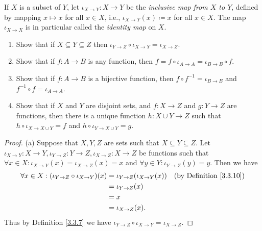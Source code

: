 \begin{exercise}\label{ex 3.3.8}
    If \(X\) is a subset of \(Y\), let \(\iota_{X \to Y} : X \to Y\) be the \emph{inclusive map from \(X\) to \(Y\)}, defined by mapping \(x \mapsto x\) for all \(x \in X\), i.e., \(\iota_{X \to Y}(x) \coloneqq x\) for all \(x \in X\).
    The map \(\iota_{X \to X}\) is in particular called the \emph{identity map} on \(X\).
    \begin{enumerate}
        \item Show that if \(X \subseteq Y \subseteq Z\) then \(\iota_{Y \to Z} \circ \iota_{X \to Y} = \iota_{X \to Z}\).
        \item Show that if \(f : A \to B\) is any function, then \(f = f \circ \iota_{A \to A} = \iota_{B \to B} \circ f\).
        \item Show that if \(f : A \to B\) is a bijective function, then \(f \circ f^{-1} = \iota_{B \to B}\) and \(f^{-1} \circ f = \iota_{A \to A}\).
        \item Show that if \(X\) and \(Y\) are disjoint sets, and \(f : X \to Z\) and \(g : Y \to Z\) are functions, then there is a unique function \(h : X \cup Y \to Z\) such that \(h \circ \iota_{X \to X \cup Y} = f\) and \(h \circ \iota_{Y \to X \cup Y} = g\).
    \end{enumerate}
\end{exercise}

\begin{proof}{(a)}
    Suppose that \(X, Y, Z\) are sets such that \(X \subseteq Y \subseteq Z\).
    Let \(\iota_{X \to Y} : X \to Y, \iota_{Y \to Z} : Y \to Z, \iota_{X \to Z} : X \to Z\) be functions such that \(\forall x \in X : \iota_{X \to Y}(x) = \iota_{X \to Z}(x) = x\) and \(\forall y \in Y : \iota_{Y \to Z}(y) = y\).
    Then we have
    \begin{align*}
        \forall x \in X : (\iota_{Y \to Z} \circ \iota_{X \to Y})(x) & = \iota_{Y \to Z}(\iota_{X \to Y}(x)) & \text{(by Definition \ref{3.3.10})} \\
                                                                     & = \iota_{Y \to Z}(x)                                                        \\
                                                                     & = x                                                                         \\
                                                                     & = \iota_{X \to Z}(x).
    \end{align*}
    Thus by Definition \ref{3.3.7} we have \(\iota_{Y \to Z} \circ \iota_{X \to Y} = \iota_{X \to Z}\).
\end{proof}

